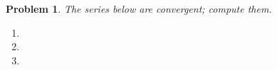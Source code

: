 \documentclass{article}
\renewcommand{\fcProblemRef}{\theproblem.\theenumi}
\newtheorem{problem}{Problem}
\begin{document}
\begin{problem}The series below are convergent; compute them. 
\begin{enumerate}[ref={\fcProblemRef}]
\item  
\item  
\item  

\end{enumerate}
\end{problem}
 
 
 


\end{document}

